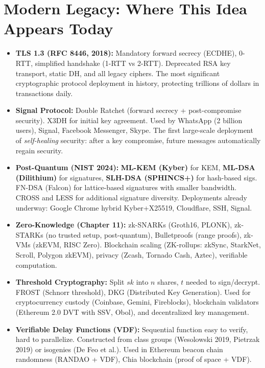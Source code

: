 \section{Modern Legacy: Where This Idea Appears Today}
\label{sec:crypto:legacy}

\begin{itemize}
\item \textbf{TLS 1.3 (RFC 8446, 2018):} Mandatory forward secrecy (ECDHE), 0-RTT, simplified handshake (1-RTT vs 2-RTT). Deprecated RSA key transport, static DH, and all legacy ciphers. The most significant cryptographic protocol deployment in history, protecting trillions of dollars in transactions daily.

\item \textbf{Signal Protocol:} Double Ratchet (forward secrecy + post-compromise security). X3DH for initial key agreement. Used by WhatsApp (2 billion users), Signal, Facebook Messenger, Skype. The first large-scale deployment of \emph{self-healing} security: after a key compromise, future messages automatically regain security.

\item \textbf{Post-Quantum (NIST 2024):} \textbf{ML-KEM (Kyber)} for KEM, \textbf{ML-DSA (Dilithium)} for signatures, \textbf{SLH-DSA (SPHINCS+)} for hash-based sigs. FN-DSA (Falcon) for lattice-based signatures with smaller bandwidth. CROSS and LESS for additional signature diversity. Deployments already underway: Google Chrome hybrid Kyber+X25519, Cloudflare, SSH, Signal.

\item \textbf{Zero-Knowledge (Chapter 11):} zk-SNARKs (Groth16, PLONK), zk-STARKs (no trusted setup, post-quantum), Bulletproofs (range proofs), zk-VMs (zkEVM, RISC Zero). Blockchain scaling (ZK-rollups: zkSync, StarkNet, Scroll, Polygon zkEVM), privacy (Zcash, Tornado Cash, Aztec), verifiable computation.

\item \textbf{Threshold Cryptography:} Split $sk$ into $n$ shares, $t$ needed to sign/decrypt. FROST (Schnorr threshold), DKG (Distributed Key Generation). Used for cryptocurrency custody (Coinbase, Gemini, Fireblocks), blockchain validators (Ethereum 2.0 DVT with SSV, Obol), and decentralized key management.

\item \textbf{Verifiable Delay Functions (VDF):} Sequential function easy to verify, hard to parallelize. Constructed from class groups (Wesolowski 2019, Pietrzak 2019) or isogenies (De Feo et al.). Used in Ethereum beacon chain randomness (RANDAO + VDF), Chia blockchain (proof of space + VDF).


\end{itemize}
